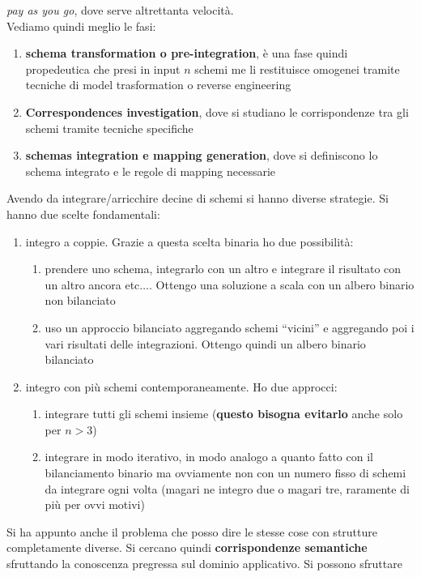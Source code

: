 \documentclass[a4paper,12pt, oneside]{book}
\begin{document}
\textit{pay as you go}, dove serve altrettanta velocità.\\
Vediamo quindi meglio le fasi:
\begin{enumerate}
  \item \textbf{schema transformation o pre-integration}, è una fase quindi
  propedeutica che presi in input $n$ schemi me li restituisce omogenei tramite
  tecniche di model trasformation o reverse engineering
  \item \textbf{Correspondences investigation}, dove si studiano le
  corrispondenze tra gli schemi tramite tecniche specifiche
  \item \textbf{schemas integration e mapping generation}, dove si definiscono
  lo schema integrato e le regole di mapping necessarie
\end{enumerate}
Avendo da integrare/arricchire decine di schemi si hanno diverse strategie. Si
hanno due scelte fondamentali:
\begin{enumerate}
  \item integro a coppie. Grazie a questa scelta binaria ho due possibilità:
  \begin{enumerate}
    \item prendere uno schema, integrarlo con un altro e integrare il risultato
    con un altro ancora etc$\ldots$. Ottengo una soluzione a scala con un albero
    binario non bilanciato
    \item uso un approccio bilanciato aggregando schemi ``vicini'' e aggregando
    poi i vari risultati delle integrazioni. Ottengo quindi un albero binario
    bilanciato 
  \end{enumerate}
  \item integro con più schemi contemporaneamente. Ho due approcci:
  \begin{enumerate}
    \item integrare tutti gli schemi insieme (\textbf{questo bisogna evitarlo}
    anche solo per $n>3$)
    \item integrare in modo iterativo, in modo analogo a quanto fatto con il
    bilanciamento binario ma ovviamente non con un numero fisso di schemi da
    integrare ogni volta (magari ne integro due o magari tre, raramente di più
    per ovvi motivi)
  \end{enumerate}
\end{enumerate}
Si ha appunto anche il problema che posso dire le stesse cose con strutture
completamente diverse. Si cercano quindi \textbf{corrispondenze semantiche}
sfruttando la conoscenza pregressa sul dominio applicativo. Si possono sfruttare
\end{document}
